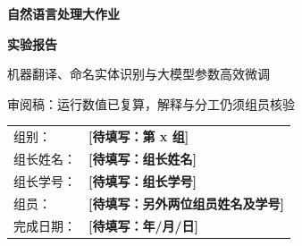 \documentclass[UTF8,a4paper,12pt,fontset=none]{ctexart}
\renewcommand{\arraystretch}{1.35}
\newcommand{\todo}[1]{\textcolor{red!70!black}{\textbf{[待填写：#1]}}}
\begin{document}
\hypersetup{pageanchor=false}
\begin{titlepage}
  \centering
  \vspace*{2.2cm}
  {\bfseries 自然语言处理大作业\par}
  \vspace{0.8cm}
  {\bfseries 实验报告\par}
  \vspace{1.8cm}
  {机器翻译、命名实体识别与大模型参数高效微调\par}
  \vspace{0.5cm}
  {\small\color{red!65!black}审阅稿：运行数值已复算，解释与分工仍须组员核验\par}
  \vfill
  \renewcommand{\arraystretch}{1.8}
  \begin{tabular}{>{\raggedleft\arraybackslash}p{3.2cm}p{7.2cm}}
    组别： & \todo{第 x 组} \\
    组长姓名： & \todo{组长姓名} \\
    组长学号： & \todo{组长学号} \\
    组员： & \todo{另外两位组员姓名及学号} \\
    完成日期： & \todo{年/月/日} \\
  \end{tabular}
  \vfill
\end{titlepage}

\hypersetup{pageanchor=true}
\begin{abstract}
为考察不同自然语言处理任务中模型设计与评价方式的差异，本文分别实现基于 Transformer 的 OPUS Books 翻译、基于 BERT 的 CLUENER2020 命名实体识别，以及基于 Qwen2.5-1.5B-Instruct 和 LoRA 的 GSM8K 数学题微调，并保存配置、逐样本预测与可独立复算的指标。原始翻译运行的 BLEU 为 13.78，但存在反向语向、疑似错配和跨集合重复；本轮按预先固定规则进行语言筛查和分组去重后重训，在新的 5,008 条测试记录上得到 BLEU 13.69、chrF++ 38.48。新旧测试集不同，分差不构成受控改进证据，语言筛查也不能证明语义完全对齐。NER 在 1,343 条开发集上的实体级 Precision、Recall 和 F1 分别为 77.16\%、80.18\% 和 78.64\%，并补充实体错误及训练中未见实体分析；开发集同时用于选模，不是独立测试表现。数学题实验修正前导小数点归一化错误后，严格准确率为基线 36.54\%、LoRA 49.58\%；最后数字抽取诊断则为 64.97\% 和 49.66\%。诊断并非官方基准成绩，但说明优劣顺序对判分协议敏感，现有证据不能单独证明数学推理能力提升。本文保留原始产物、旧评分及自动候选案例，组员仍须核查并以自己的理解修订分析。

\noindent\textbf{关键词：} 机器翻译；命名实体识别；Transformer；BERT；LoRA
\end{abstract}
\end{document}
